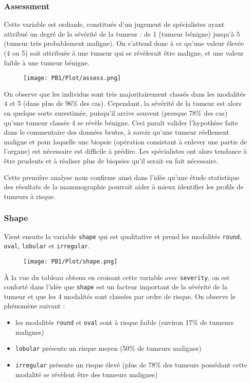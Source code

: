\documentclass[a4paper]{report}
\begin{document}
\subsubsection{Assessment}
Cette variable est ordianle, constituée d'un jugement de spécialistes ayant attribué un degré de la sévérité de la tumeur : de 1 (tumeur bénigne) jusqu'à 5 (tumeur très probablement maligne). On s'attend donc à ce qu'une valeur élevée (4 ou 5) soit attribuée à une tumeur qui se révèlerait être maligne, et une valeur faible à une tumeur bénigne.

\begin{figure}[!ht]
	\centering
     	\texttt{[image: PB1/Plot/assess.png]} 
\end{figure}


On observe que les individus sont très majoritairement classés dans les modalités 4 et 5 (dans plus de 96\% des cas). Cependant, la sévérité de la tumeur est alors en quelque sorte surestimée, puisqu'il arrive souvent (presque 78\% des cas) qu'une tumeur classée 4 se révèle bénigne. Ceci paraît valider l'hypothèse faite dans le commentaire des données brutes, à savoir qu'une tumeur réellement maligne et pour laquelle une biopsie (opération consistant à enlever une partie de l'organe) est nécessaire est difficile à prédire. Les spécialistes ont alors tendance à être prudents et à réaliser plus de biopsies qu'il serait en fait nécessaire.   

Cette première analyse nous confirme ainsi dans l'idée qu'une étude statistique des résultats de la mammographie pourrait aider à mieux identifier les profils de tumeurs à risque.


\subsubsection{Shape}
Vient ensuite la variable \verb|shape| qui est qualitative et prend les modalités \verb|round|, \verb|oval|, \verb|lobular| et \verb|irregular|. 

\begin{figure}[!ht]
	\centering
     	\texttt{[image: PB1/Plot/shape.png]} 
\end{figure}

À la vue du tableau obtenu en croisant cette variable avec \verb|severity|, on est conforté dans l'idée que \verb|shape| est un facteur important de la sévérité de la tumeur et que les 4 modalités sont classées par ordre de risque. On observe le phénomène suivant :
\begin{itemize}
\item les modalités \verb|round| et \verb|oval| sont à risque faible (environ 17\% de tumeurs malignes)
\item \verb|lobular| présente un risque moyen (50\% de tumeurs malignes)
\item \verb|irregular| présente un risque élevé (plus de 78\% des tumeurs possédant cette modalité se révèlent être des tumeurs malignes)
\end{itemize}
\end{document}
